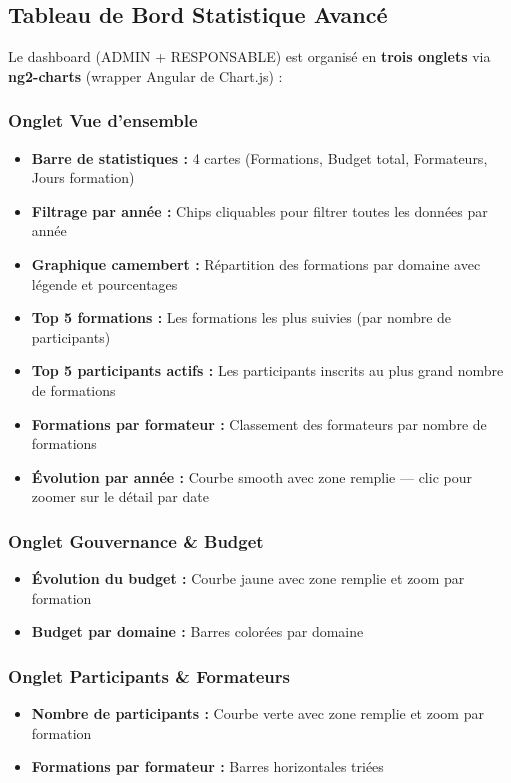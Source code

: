 \documentclass[12pt,a4paper]{report}
\begin{document}
\subsection{Tableau de Bord Statistique Avanc\'{e}}

Le dashboard (ADMIN + RESPONSABLE) est organis\'{e} en \textbf{trois onglets} via \textbf{ng2-charts} (wrapper Angular de Chart.js) :

\subsubsection{Onglet Vue d'ensemble}
\begin{itemize}
  \item \textbf{Barre de statistiques :} 4 cartes (Formations, Budget total, Formateurs, Jours formation)
  \item \textbf{Filtrage par ann\'{e}e :} Chips cliquables pour filtrer toutes les donn\'{e}es par ann\'{e}e
  \item \textbf{Graphique camembert :} R\'{e}partition des formations par domaine avec l\'{e}gende et pourcentages
  \item \textbf{Top 5 formations :} Les formations les plus suivies (par nombre de participants)
  \item \textbf{Top 5 participants actifs :} Les participants inscrits au plus grand nombre de formations
  \item \textbf{Formations par formateur :} Classement des formateurs par nombre de formations
  \item \textbf{\'{E}volution par ann\'{e}e :} Courbe smooth avec zone remplie --- clic pour zoomer sur le d\'{e}tail par date
\end{itemize}

\subsubsection{Onglet Gouvernance \& Budget}
\begin{itemize}
  \item \textbf{\'{E}volution du budget :} Courbe jaune avec zone remplie et zoom par formation
  \item \textbf{Budget par domaine :} Barres color\'{e}es par domaine
\end{itemize}

\subsubsection{Onglet Participants \& Formateurs}
\begin{itemize}
  \item \textbf{Nombre de participants :} Courbe verte avec zone remplie et zoom par formation
  \item \textbf{Formations par formateur :} Barres horizontales tri\'{e}es
\end{itemize}
\end{document}
